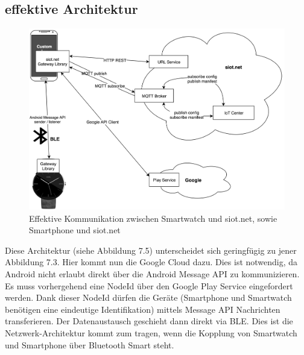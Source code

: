 \subsection{effektive Architektur}
\begin{figure}[h]
  \centering
  \includegraphics[scale=0.15]{98_Bilder/07_Architektur/03_Architektur}
  \caption[Effektive Netzwerk-Architektur mit BLE/ohne WLAN]{Effektive Kommunikation zwischen Smartwatch und siot.net, sowie Smartphone und siot.net}
\end{figure}
Diese Architektur (siehe Abbildung 7.5) unterscheidet sich geringfügig zu jener Abbildung 7.3. Hier kommt nun die Google Cloud dazu. Dies ist notwendig, da Android nicht erlaubt direkt über die Android Message API zu kommunizieren. Es muss vorhergehend eine NodeId über den Google Play Service eingefordert werden. Dank dieser NodeId dürfen die Geräte (Smartphone und Smartwatch benötigen eine eindeutige Identifikation) mittels Message API Nachrichten transferieren. Der Datenaustausch geschieht dann direkt via BLE. Dies ist die Netzwerk-Architektur kommt zum tragen, wenn die Kopplung von Smartwatch und Smartphone über Bluetooth Smart steht.


